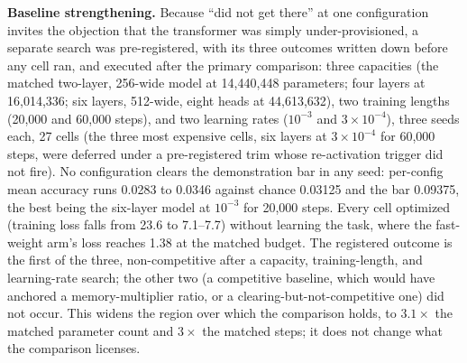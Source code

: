 \textbf{Baseline strengthening.} Because ``did not get there'' at one
configuration invites the objection that the transformer was simply
under-provisioned, a separate search was pre-registered, with its three
outcomes written down before any cell ran, and executed after the
primary comparison: three capacities (the matched two-layer, 256-wide
model at 14{,}440{,}448 parameters; four layers at 16{,}014{,}336; six
layers, 512-wide, eight heads at 44{,}613{,}632), two training lengths
(20{,}000 and 60{,}000 steps), and two learning rates ($10^{-3}$ and
$3\times10^{-4}$), three seeds each, 27 cells (the three most expensive
cells, six layers at $3\times10^{-4}$ for 60{,}000 steps, were deferred
under a pre-registered trim whose re-activation trigger did not fire).
No configuration clears the demonstration bar in any seed: per-config
mean accuracy runs 0.0283 to 0.0346 against chance 0.03125 and the bar
0.09375, the best being the six-layer model at $10^{-3}$ for 20{,}000
steps. Every cell optimized (training loss falls from 23.6 to 7.1--7.7)
without learning the task, where the fast-weight arm's loss reaches
1.38 at the matched budget. %
The registered outcome is the first of the three, non-competitive after
a capacity, training-length, and learning-rate search; the other two
(a competitive baseline, which would have anchored a memory-multiplier
ratio, or a clearing-but-not-competitive one) did not occur. This
widens the region over which the comparison holds, to $3.1\times$ the
matched parameter count and $3\times$ the matched steps; it does not
change what the comparison licenses.
